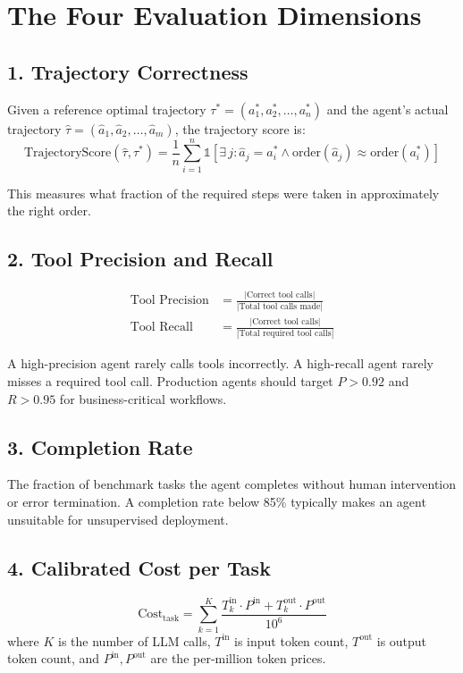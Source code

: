 \section{The Four Evaluation Dimensions}

\subsection{1. Trajectory Correctness}
Given a reference optimal trajectory $\tau^* = (a_1^*, a_2^*, \dots, a_n^*)$ and the agent's actual trajectory $\hat{\tau} = (\hat{a}_1, \hat{a}_2, \dots, \hat{a}_m)$, the trajectory score is:
\begin{equation}
\text{TrajectoryScore}(\hat{\tau}, \tau^*) = \frac{1}{n} \sum_{i=1}^n \mathbb{1}\!\left[\exists\, j: \hat{a}_j = a_i^* \wedge \text{order}(\hat{a}_j) \approx \text{order}(a_i^*)\right]
\end{equation}

This measures what fraction of the required steps were taken in approximately the right order.

\subsection{2. Tool Precision and Recall}
\begin{align}
\text{Tool Precision} &= \frac{|\text{Correct tool calls}|}{|\text{Total tool calls made}|} \\[4pt]
\text{Tool Recall} &= \frac{|\text{Correct tool calls}|}{|\text{Total required tool calls}|}
\end{align}

A high-precision agent rarely calls tools incorrectly. A high-recall agent rarely misses a required tool call. Production agents should target $P > 0.92$ and $R > 0.95$ for business-critical workflows.

\subsection{3. Completion Rate}
The fraction of benchmark tasks the agent completes without human intervention or error termination. A completion rate below 85\% typically makes an agent unsuitable for unsupervised deployment.

\subsection{4. Calibrated Cost per Task}
\begin{equation}
\text{Cost}_{\text{task}} = \sum_{k=1}^{K} \frac{T_k^{\text{in}} \cdot P^{\text{in}} + T_k^{\text{out}} \cdot P^{\text{out}}}{10^6}
\end{equation}
where $K$ is the number of LLM calls, $T^{\text{in}}$ is input token count, $T^{\text{out}}$ is output token count, and $P^{\text{in}}, P^{\text{out}}$ are the per-million token prices.

